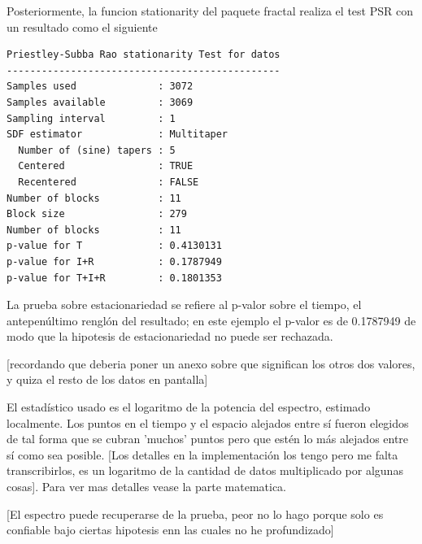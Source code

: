 Posteriormente, la funcion stationarity del paquete fractal realiza el test PSR
con un resultado como el siguiente

\begin{lstlisting}
Priestley-Subba Rao stationarity Test for datos
-----------------------------------------------
Samples used              : 3072 
Samples available         : 3069 
Sampling interval         : 1 
SDF estimator             : Multitaper 
  Number of (sine) tapers : 5 
  Centered                : TRUE 
  Recentered              : FALSE 
Number of blocks          : 11 
Block size                : 279 
Number of blocks          : 11 
p-value for T             : 0.4130131 
p-value for I+R           : 0.1787949 
p-value for T+I+R         : 0.1801353 
\end{lstlisting}

La prueba sobre estacionariedad se refiere al p-valor sobre el tiempo, el antepen\'ultimo
rengl\'on del resultado; en este ejemplo el p-valor es de 0.1787949 de modo que
la hipotesis de estacionariedad no puede ser rechazada. 

[recordando que deberia poner un anexo sobre que significan los
otros dos valores, y quiza el resto de los datos en pantalla]

El estad\'istico usado es el logaritmo de la potencia del espectro, estimado localmente.
Los puntos en el tiempo y el espacio alejados entre s\'i fueron elegidos de tal forma que
se cubran 'muchos' puntos pero que est\'en lo m\'as alejados entre s\'i como sea posible.
[Los detalles en la implementaci\'on los tengo pero me falta transcribirlos, es un logaritmo
de la cantidad de datos multiplicado por algunas cosas]. Para ver mas detalles vease la parte matematica.

[El espectro puede recuperarse de la prueba, peor no lo hago porque solo
es confiable bajo ciertas hipotesis enn las cuales no he profundizado]


